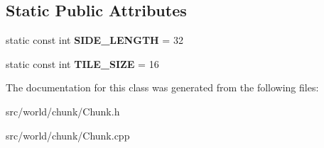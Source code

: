 \subsection*{Static Public Attributes}
\begin{DoxyCompactItemize}
\item 
\hypertarget{classChunk_a219c57f40ca72814048045f066adc46e}{static const int {\bfseries S\-I\-D\-E\-\_\-\-L\-E\-N\-G\-T\-H} = 32}\label{classChunk_a219c57f40ca72814048045f066adc46e}

\item 
\hypertarget{classChunk_a49f5a883393d976a0d8bbc0123e751d1}{static const int {\bfseries T\-I\-L\-E\-\_\-\-S\-I\-Z\-E} = 16}\label{classChunk_a49f5a883393d976a0d8bbc0123e751d1}

\end{DoxyCompactItemize}


The documentation for this class was generated from the following files\-:\begin{DoxyCompactItemize}
\item 
src/world/chunk/Chunk.\-h\item 
src/world/chunk/Chunk.\-cpp\end{DoxyCompactItemize}
